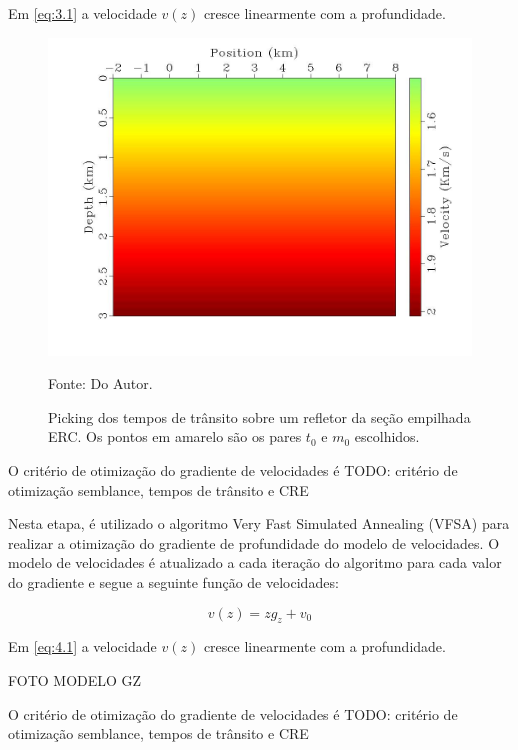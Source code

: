 Em \ref{eq:3.1} a velocidade $v(z)$ cresce linearmente com a profundidade.

\begin{figure}[H]
\caption{Picking dos tempos de trânsito sobre um refletor da seção empilhada ERC. Os pontos
em amarelo são os pares $t_0$ e $m_0$ escolhidos.}
\begin{center}
\includegraphics[scale=0.3]{images/gzvel.jpeg}
\vspace{-0.3cm}
\end{center}
\begin{center}
 Fonte: Do Autor.
\end{center}
\label{fig:3.2}
\end{figure}


O critério de otimização do gradiente de velocidades é 
TODO: critério de otimização semblance, tempos de trânsito e CRE

Nesta etapa, é utilizado o algoritmo Very Fast Simulated Annealing (VFSA) para realizar a otimização do
gradiente de profundidade do modelo de velocidades. O modelo de velocidades é atualizado a cada iteração do
algoritmo para cada valor do gradiente e segue a seguinte função de velocidades:

\begin{equation}
\label{eq:4.1}
v(z)=z g_z+v_0
\end{equation}

Em \ref{eq:4.1} a velocidade $v(z)$ cresce linearmente com a profundidade.

FOTO MODELO GZ

O critério de otimização do gradiente de velocidades é 
TODO: critério de otimização semblance, tempos de trânsito e CRE



